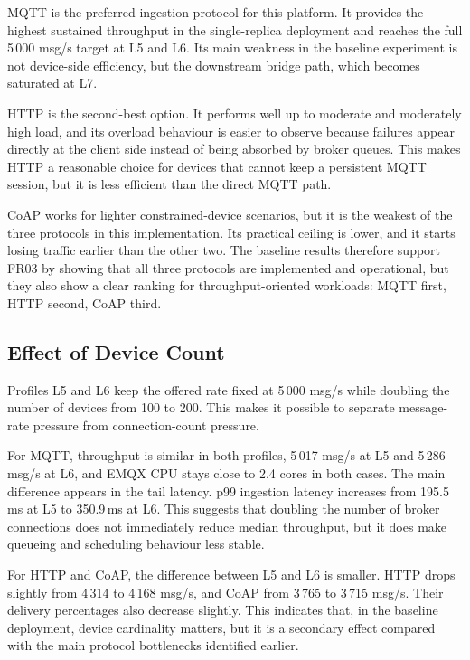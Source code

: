 \gls{MQTT} is the preferred ingestion protocol for this platform. It provides the highest sustained throughput in the single-replica deployment and reaches the full 5\,000 msg/s target at L5 and L6. Its main weakness in the baseline experiment is not device-side efficiency, but the downstream bridge path, which becomes saturated at L7.

\gls{HTTP} is the second-best option. It performs well up to moderate and moderately high load, and its overload behaviour is easier to observe because failures appear directly at the client side instead of being absorbed by broker queues. This makes \gls{HTTP} a reasonable choice for devices that cannot keep a persistent \gls{MQTT} session, but it is less efficient than the direct \gls{MQTT} path.

\gls{CoAP} works for lighter constrained-device scenarios, but it is the weakest of the three protocols in this implementation. Its practical ceiling is lower, and it starts losing traffic earlier than the other two. The baseline results therefore support FR03 by showing that all three protocols are implemented and operational, but they also show a clear ranking for throughput-oriented workloads: \gls{MQTT} first, \gls{HTTP} second, \gls{CoAP} third.

\subsection{Effect of Device Count}
\label{subsec:EvalBaselineCardinality}

Profiles L5 and L6 keep the offered rate fixed at 5\,000 msg/s while doubling the number of devices from 100 to 200. This makes it possible to separate message-rate pressure from connection-count pressure.

For \gls{MQTT}, throughput is similar in both profiles, 5\,017 msg/s at L5 and 5\,286 msg/s at L6, and EMQX CPU stays close to 2.4 cores in both cases. The main difference appears in the tail latency. p99 ingestion latency increases from 195.5\,ms at L5 to 350.9\,ms at L6. This suggests that doubling the number of broker connections does not immediately reduce median throughput, but it does make queueing and scheduling behaviour less stable.

For \gls{HTTP} and \gls{CoAP}, the difference between L5 and L6 is smaller. \gls{HTTP} drops slightly from 4\,314 to 4\,168 msg/s, and \gls{CoAP} from 3\,765 to 3\,715 msg/s. Their delivery percentages also decrease slightly. This indicates that, in the baseline deployment, device cardinality matters, but it is a secondary effect compared with the main protocol bottlenecks identified earlier.


